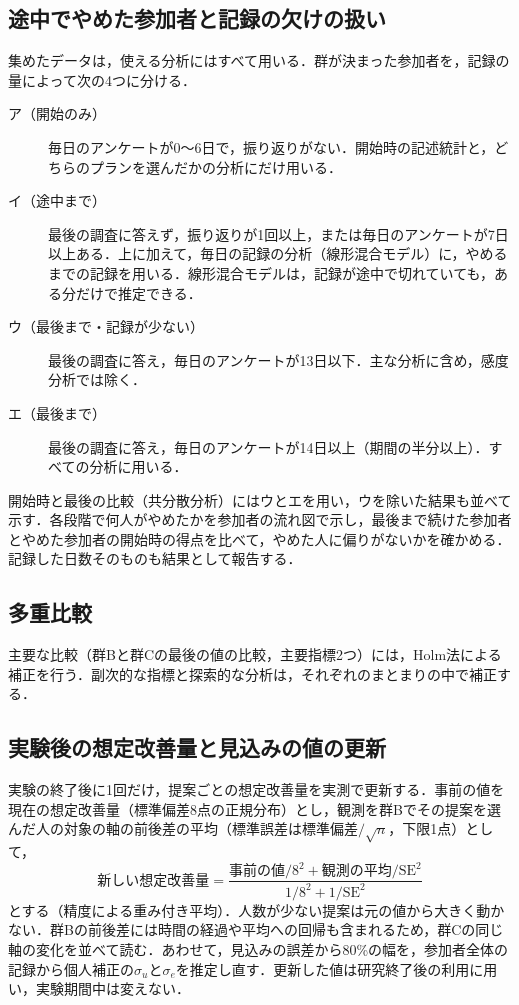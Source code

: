 \subsection{途中でやめた参加者と記録の欠けの扱い}\label{sec:missing}
集めたデータは，使える分析にはすべて用いる．群が決まった参加者を，記録の量によって次の4つに分ける．
\begin{description}
\item[ア（開始のみ）] 毎日のアンケートが0〜6日で，振り返りがない．開始時の記述統計と，どちらのプランを選んだかの分析にだけ用いる．
\item[イ（途中まで）] 最後の調査に答えず，振り返りが1回以上，または毎日のアンケートが7日以上ある．上に加えて，毎日の記録の分析（線形混合モデル）に，やめるまでの記録を用いる．線形混合モデルは，記録が途中で切れていても，ある分だけで推定できる\cite{laird1982}．
\item[ウ（最後まで・記録が少ない）] 最後の調査に答え，毎日のアンケートが13日以下．主な分析に含め，感度分析では除く．
\item[エ（最後まで）] 最後の調査に答え，毎日のアンケートが14日以上（期間の半分以上）．すべての分析に用いる．
\end{description}
開始時と最後の比較（共分散分析）にはウとエを用い，ウを除いた結果も並べて示す．各段階で何人がやめたかを参加者の流れ図で示し，最後まで続けた参加者とやめた参加者の開始時の得点を比べて，やめた人に偏りがないかを確かめる．記録した日数そのものも結果として報告する．

\subsection{多重比較}
主要な比較（群Bと群Cの最後の値の比較，主要指標2つ）には，Holm法\cite{holm1979}による補正を行う．副次的な指標と探索的な分析は，それぞれのまとまりの中で補正する．

\subsection{実験後の想定改善量と見込みの値の更新}
実験の終了後に1回だけ，提案ごとの想定改善量を実測で更新する．事前の値を現在の想定改善量（標準偏差8点の正規分布）とし，観測を群Bでその提案を選んだ人の対象の軸の前後差の平均（標準誤差は標準偏差$/\sqrt{n}$，下限1点）として，
\begin{equation}
\text{新しい想定改善量}=\frac{\text{事前の値}/8^2+\text{観測の平均}/\mathrm{SE}^2}{1/8^2+1/\mathrm{SE}^2}
\end{equation}
とする（精度による重み付き平均）．人数が少ない提案は元の値から大きく動かない．群Bの前後差には時間の経過や平均への回帰も含まれるため，群Cの同じ軸の変化を並べて読む．あわせて，見込みの誤差から80\%の幅を，参加者全体の記録から個人補正の$\sigma_u$と$\sigma_e$を推定し直す．更新した値は研究終了後の利用に用い，実験期間中は変えない．


